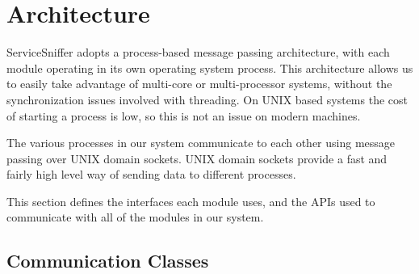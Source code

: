 \documentclass[titlepage]{article}
\begin{document}

\section{Architecture
    \label{architecture}
}

ServiceSniffer adopts a process-based message passing architecture, with each
module operating in its own operating system process.  This architecture allows
us to easily take advantage of multi-core or multi-processor systems, without
the synchronization issues involved with threading.  On UNIX based systems the
cost of starting a process is low, so this is not an issue on modern machines.

The various processes in our system communicate to each other using message
passing over UNIX domain sockets.  UNIX domain sockets provide a fast and
fairly high level way of sending data to different processes.

This section defines the interfaces each module uses, and the APIs used to
communicate with all of the modules in our system.


\subsection{Communication Classes
    \label{communication_classes}
}
\end{document}
